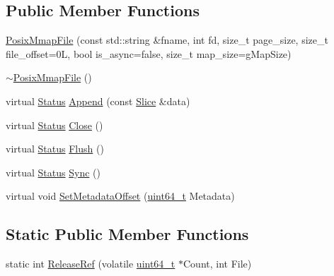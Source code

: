 \subsection*{Public Member Functions}
\begin{DoxyCompactItemize}
\item 
\hyperlink{classleveldb_1_1anonymous__namespace_02env__posix_8cc_03_1_1_posix_mmap_file_a9be4f9b68a10af1992d8d2ca3c41ebe4}{Posix\+Mmap\+File} (const std\+::string \&fname, int fd, size\+\_\+t page\+\_\+size, size\+\_\+t file\+\_\+offset=0\+L, bool is\+\_\+async=false, size\+\_\+t map\+\_\+size=g\+Map\+Size)
\item 
\hyperlink{classleveldb_1_1anonymous__namespace_02env__posix_8cc_03_1_1_posix_mmap_file_a05bc12a440d1838b7c59d25ebfb291ce}{$\sim$\+Posix\+Mmap\+File} ()
\item 
virtual \hyperlink{classleveldb_1_1_status}{Status} \hyperlink{classleveldb_1_1anonymous__namespace_02env__posix_8cc_03_1_1_posix_mmap_file_a656efd9f62fe1adb3d9d580870e9cecf}{Append} (const \hyperlink{classleveldb_1_1_slice}{Slice} \&data)
\item 
virtual \hyperlink{classleveldb_1_1_status}{Status} \hyperlink{classleveldb_1_1anonymous__namespace_02env__posix_8cc_03_1_1_posix_mmap_file_ad895d58f023a345e10fa4c7c3018af35}{Close} ()
\item 
virtual \hyperlink{classleveldb_1_1_status}{Status} \hyperlink{classleveldb_1_1anonymous__namespace_02env__posix_8cc_03_1_1_posix_mmap_file_a4962712b0ad2fcb852f5704870b7882d}{Flush} ()
\item 
virtual \hyperlink{classleveldb_1_1_status}{Status} \hyperlink{classleveldb_1_1anonymous__namespace_02env__posix_8cc_03_1_1_posix_mmap_file_a48ab721906ed93aea1c9d1dd79ba0498}{Sync} ()
\item 
virtual void \hyperlink{classleveldb_1_1anonymous__namespace_02env__posix_8cc_03_1_1_posix_mmap_file_acc5902381638f601f91f37f34787f593}{Set\+Metadata\+Offset} (\hyperlink{stdint_8h_aaa5d1cd013383c889537491c3cfd9aad}{uint64\+\_\+t} Metadata)
\end{DoxyCompactItemize}
\subsection*{Static Public Member Functions}
\begin{DoxyCompactItemize}
\item 
static int \hyperlink{classleveldb_1_1anonymous__namespace_02env__posix_8cc_03_1_1_posix_mmap_file_a2a19f6a33c994f7be4df4a185accbeba}{Release\+Ref} (volatile \hyperlink{stdint_8h_aaa5d1cd013383c889537491c3cfd9aad}{uint64\+\_\+t} $\ast$Count, int File)
\end{DoxyCompactItemize}
